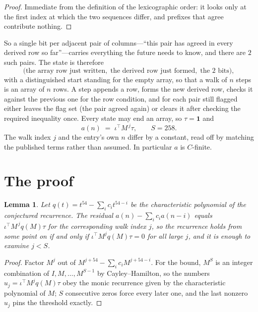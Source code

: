 \documentclass[11pt,a4paper]{article}
\theoremstyle{plain}
\newtheorem{lemma}[theorem]{Lemma}
\theoremstyle{definition}
\begin{document}
\begin{proof}
Immediate from the definition of the lexicographic order: it looks only at the first index at
which the two sequences differ, and prefixes that agree contribute nothing.
\end{proof}

So a single bit per adjacent pair of columns---``this pair has agreed in every derived row so
far''---carries everything the future needs to know, and there are $2$ such pairs. The state
is therefore
\[
\bigl(\text{the array row just written},\; \text{the derived row just formed},\;
\text{the 2 bits}\bigr),
\]
with a distinguished start standing for the empty array, so that a walk of $n$ steps is an array
of $n$ rows. A step appends a row, forms the new derived row, checks it against the previous one
for the row condition, and for each pair still flagged either leaves the flag set (the pair
agreed again) or clears it after checking the required inequality once. Every state may end an
array, so $\tau=\mathbf{1}$ and
\[
a(n)\;=\;\iota^{\!\top}M^{\,j}\tau ,\qquad S=258.
\]
The walk index $j$ and the entry's own $n$ differ by a constant, read off by matching the
published terms rather than assumed. In particular $a$ is $C$-finite.

\section{The proof}

\begin{lemma}\label{lem:crit}
Let $q(t)=t^{54}-\sum_i c_it^{54-i}$ be the characteristic polynomial of the
conjectured recurrence. The residual $a(n)-\sum_ic_ia(n-i)$ equals
$\iota^{\!\top}M^{\,j}q(M)\tau$ for the corresponding walk index $j$, so the recurrence
holds from some point on if and only if $\iota^{\!\top}M^{j}q(M)\tau=0$ for all large $j$,
and it is enough to examine $j<S$.
\end{lemma}

\begin{proof}
Factor $M^{j}$ out of $M^{j+54}-\sum_ic_iM^{j+54-i}$. For the bound, $M^{S}$
is an integer combination of $I,M,\dots,M^{S-1}$ by Cayley--Hamilton, so the numbers
$u_j=\iota^{\!\top}M^{j}q(M)\tau$ obey the monic recurrence given by the characteristic
polynomial of $M$; $S$ consecutive zeros force every later one, and the last nonzero $u_j$
pins the threshold exactly.
\end{proof}
\end{document}
